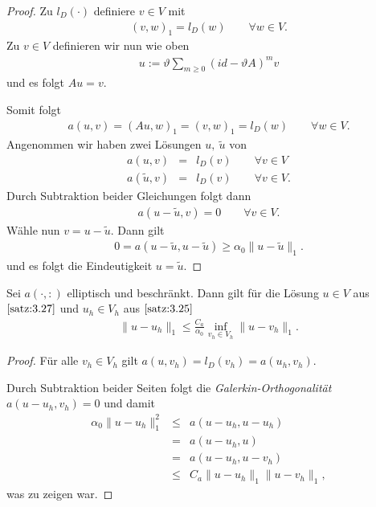 \begin{proof}
    Zu $l_D(\cdot)$ definiere $v\in V$ mit
    \begin{eqnarray*}
        (v, w)_1 = l_D(w) \qquad \forall w\in V.
    \end{eqnarray*}
    Zu $v\in V$ definieren wir nun wie oben
    \begin{eqnarray*}
        u := \vartheta \sum_{m\ge0} (id - \vartheta A)^m v
    \end{eqnarray*}
    und es folgt $Au = v$.
    
    Somit folgt
    \begin{eqnarray*}
        a(u, v) = (Au, w)_1 = (v, w)_1 = l_D(w)
        \qquad \forall w\in V.
    \end{eqnarray*}
    Angenommen wir haben zwei Lösungen $u, \ \tilde u$ von
    \begin{eqnarray*}
        a(u, v) &=& l_D(v)
        \qquad \forall v\in V \\
        a(\tilde u, v) &=& l_D(v)
        \qquad \forall v\in V.
    \end{eqnarray*}
    Durch Subtraktion beider Gleichungen folgt dann
    \begin{eqnarray*}
        a(u - \tilde u, v) = 0
        \qquad \forall v\in V.
    \end{eqnarray*}
    Wähle nun $v = u - \tilde u$.
    Dann gilt
    \begin{eqnarray*}
        0 = a(u - \tilde u, u - \tilde u) \ge \alpha_0 \|u - \tilde u\|_1.
    \end{eqnarray*}
    und es folgt die Eindeutigkeit $u = \tilde u$.
\end{proof}


\begin{Satz}
    \label{satz:3.28}
    Sei $a(\cdot, :)$ elliptisch und beschränkt. Dann gilt für die
    Lösung $u\in V$ aus $\eqref{satz:3.27}$ und $u_h\in V_h$ aus
    $\eqref{satz:3.25}$
    \begin{eqnarray*}
        \|u - u_h\|_1 \le \frac{C_a}{\alpha_0} \inf_{v_h\in V_h} \|u - v_h\|_1.
    \end{eqnarray*}
\end{Satz}


\begin{proof}
    Für alle $v_h\in V_h$ gilt $a(u, v_h) = l_D(v_h) = a(u_h, v_h)$.

    Durch Subtraktion beider Seiten folgt die \emph{Galerkin-Orthogonalität}
    $a(u - u_h, v_h) = 0$ und damit
    \begin{eqnarray*}
              \alpha_0 \|u - u_h\|_1^2
        &\le& a(u - u_h, u - u_h) \\
        &=& a(u - u_h, u) \\
        &=& a(u - u_h, u - v_h) \\
        &\le& C_a \|u - u_h\|_1 \|u - v_h\|_1,
    \end{eqnarray*}
    was zu zeigen war.
\end{proof}


